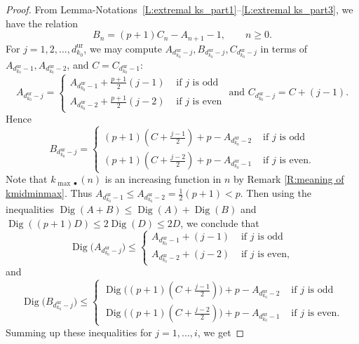 \documentclass[12pt]{amsart}
\theoremstyle{definition}
\numberwithin{equation}{subsection}
\DeclareMathOperator{\Dig}{Dig}
\newcommand{\unr}{\mathrm{ur}}
\begin{document}
\begin{proof}
From Lemma-Notations~\ref{L:extremal ks_part1}--\ref{L:extremal ks_part3}, we have the relation
\[
B_n = (p+1) C_n - A_{n+1}-1, \qquad n\geq0.
\]
For $j=1,2,...,d^\unr_{k_0}$, we may compute $A_{d_{k_0}^\unr - j},B_{d_{k_0}^\unr - j},C_{d_{k_0}^\unr - j}$ in terms of $A_{d_{k_0}^\unr - 1},A_{d_{k_0}^\unr - 2}$, and $C= C_{d_{k_0}^\unr - 1}:$
\begin{equation*}
\label{E:A_n and C_n}
A_{d_{k_0}^\unr - j} =
\begin{cases}
A_{d_{k_0}^\unr -1}+ \frac{p+1}{2} (j-1) & \textrm{ if } j \textrm{ is odd}
\\
A_{d_{k_0}^\unr -2} +\frac{p+1}{2}(j-2) & \textrm{ if } j \textrm{ is even}
\end{cases} 
\textrm {    and  }C_{d_{k_0}^\unr - j} = C+ (j-1).
\end{equation*}
Hence
\begin{equation*}
 B_{d_{k_0}^\unr - j} =
\begin{cases}
(p+1)(C+\frac{j-1}{2})+p- A_{d_{k_0}^\unr -2} &  \textrm{ if } j \textrm{ is odd}
\\
(p+1)(C+\frac{j-2}{2})+p- A_{d_{k_0}^\unr -1} & \textrm{ if } j \textrm{ is even}.
\end{cases} 
\end{equation*}
Note that $k_{\max\bullet}(n)$ is an increasing function in $n$ by Remark \ref{R:meaning of kmidminmax}.  Thus $A_{d_{k_0}^\unr -1}\leq A_{d_{k_0}^\unr -2}=\tfrac 12(p+1)<p$. Then using the inequalities $\Dig(A+B)\leq\Dig(A) + \Dig(B)  $ and $\Dig((p+1)D)\leq 2\Dig(D) \leq 2D$, we conclude that
\begin{equation*}
\nonumber
\Dig\big(A_{d_{k_0}^\unr - j}\big) \leq
\begin{cases}
A_{d_{k_0}^\unr -1}+ (j-1) &  \textrm{ if } j \textrm{ is odd}
\\
A_{d_{k_0}^\unr -2}+ (j-2) & \textrm{ if } j \textrm{ is even},
\end{cases} 
\end{equation*}
and
\begin{equation*}
\label{Eq1}
\Dig\big(B_{d_{k_0}^\unr - j}\big) \leq
\begin{cases}
\Dig\big((p+1)(C+\frac{j-1}{2})\big)+p- A_{d_{k_0}^\unr -2}&  \textrm{ if } j \textrm{ is odd}
\\
\Dig\big((p+1)(C+\frac{j-2}{2})\big)+p- A_{d_{k_0}^\unr -1}& \textrm{ if } j  \textrm{ is even}.
\end{cases} 
\end{equation*}  
Summing up these inequalities for $j=1,\dots, i$, we get


\end{proof}
\end{document}
